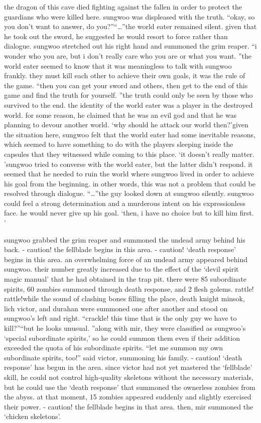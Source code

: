 the dragon of this cave died fighting against the fallen in order to protect the guardians who were killed here.
 sungwoo was displeased with the truth.
“okay, so you don’t want to answer, do you?”“…”the world eater remained silent.
 given that he took out the sword, he suggested he would resort to force rather than dialogue.
 sungwoo stretched out his right hand and summoned the grim reaper.
“i wonder who you are, but i don’t really care who you are or what you want.
”the world eater seemed to know that it was meaningless to talk with sungwoo frankly.
they must kill each other to achieve their own goals, it was the rule of the game.
“then you can get your sword and others, then get to the end of this game and find the truth for yourself.
”the truth could only be seen by those who survived to the end.
the identity of the world eater was a player in the destroyed world.
for some reason, he claimed that he was an evil god and that he was planning to devour another world.
‘why should he attack our world then?’given the situation here, sungwoo felt that the world eater had some inevitable reasons, which seemed to have something to do with the players sleeping inside the capsules that they witnessed while coming to this place.
‘it doesn’t really matter.
’sungwoo tried to converse with the world eater, but the latter didn’t respond.
 it seemed that he needed to ruin the world where sungwoo lived in order to achieve his goal from the beginning.
in other words, this was not a problem that could be resolved through dialogue.
“…”the guy looked down at sungwoo silently.
 sungwoo could feel a strong determination and a murderous intent on his expressionless face.
 he would never give up his goal.
‘then, i have no choice but to kill him first.
’

sungwoo grabbed the grim reaper and summoned the undead army behind his back.
- caution! the fellblade begins in this area.
- caution! ‘death response’ begins in this area.
an overwhelming force of an undead army appeared behind sungwoo.
 their number greatly increased due to the effect of the ‘devil spirit magic manual’ that he had obtained in the trap pit.
there were 85 subordinate spirits, 60 zombies summoned through death response, and 2 flesh golems.
rattle! rattle!while the sound of clashing bones filling the place, death knight minsok, lich victor, and durahan were summoned one after another and stood on sungwoo’s left and right.
“crackle! this time that is the only guy we have to kill?”“but he looks unusual.
”along with mir, they were classified as sungwoo’s ‘special subordinate spirits,’ so he could summon them even if their addition exceeded the quota of his subordinate spirits.
“let me summon my own subordinate spirits, too!” said victor, summoning his family.
- caution! ‘death response’ has begun in the area.
since victor had not yet mastered the ‘fellblade’ skill, he could not control high-quality skeletons without the necessary materials, but he could use the ‘death response’ that summoned the ownerless zombies from the abyss.
at that moment, 15 zombies appeared suddenly and slightly exercised their power.
- caution! the fellblade begins in that area.
then, mir summoned the ‘chicken skeletons’.


 